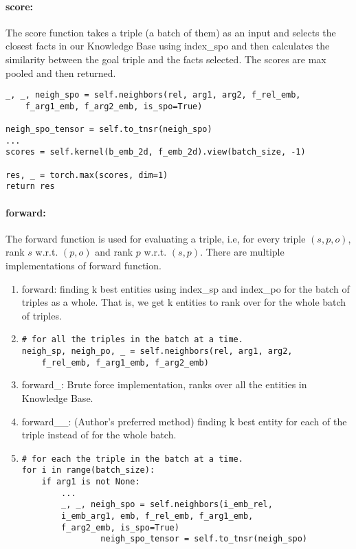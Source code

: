 \documentclass[Other]{iitddiss}
\begin{document}
\paragraph{score:}
The score function takes a triple (a batch of them) as an input and selects the closest facts in our Knowledge Base using index\_spo and then calculates the similarity between the goal triple and the facts selected. The scores are max pooled and then returned.

\begin{lstlisting}
_, _, neigh_spo = self.neighbors(rel, arg1, arg2, f_rel_emb, 
	f_arg1_emb, f_arg2_emb, is_spo=True)

neigh_spo_tensor = self.to_tnsr(neigh_spo)
...
scores = self.kernel(b_emb_2d, f_emb_2d).view(batch_size, -1)

res, _ = torch.max(scores, dim=1)
return res
\end{lstlisting}

\paragraph{forward:}
The forward function is used for evaluating a triple, i.e, for every triple \((s, p, o)\), rank \(s\) w.r.t. \((p, o)\) and rank \(p\) w.r.t. \((s, p)\). There are multiple implementations of forward function.

\begin{enumerate}
\item forward: finding k best entities using index\_sp and index\_po for the batch of triples as a whole. That is, we get k entities to rank over for the whole batch of triples.
\item {\begin{lstlisting}
# for all the triples in the batch at a time.
neigh_sp, neigh_po, _ = self.neighbors(rel, arg1, arg2, 
	f_rel_emb, f_arg1_emb, f_arg2_emb)

\end{lstlisting}}
\item forward\_: Brute force implementation, ranks over all the entities in Knowledge Base.
\item forward\_\_: (Author's preferred method) finding k best entity for each of the triple instead of for the whole batch.
\item {\begin{lstlisting}
# for each the triple in the batch at a time.
for i in range(batch_size):
	if arg1 is not None:
		...
		_, _, neigh_spo = self.neighbors(i_emb_rel, 
		i_emb_arg1, emb, f_rel_emb, f_arg1_emb, 
		f_arg2_emb, is_spo=True)
                neigh_spo_tensor = self.to_tnsr(neigh_spo)
\end{lstlisting}}
\end{enumerate}
\end{document}
